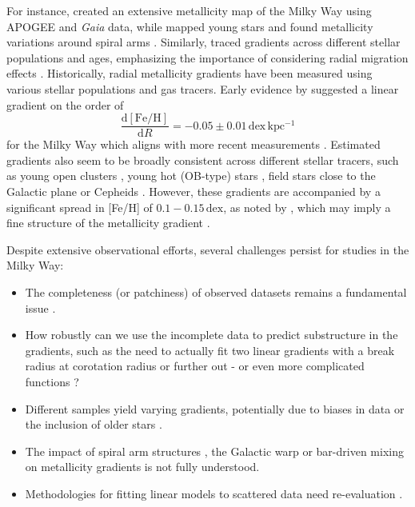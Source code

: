 \documentclass[twocolumn,apj,numberedappendix,appendixfloats]{openjournal}
\begin{document}
\begin{CJK*}{UTF8}{gbsn}
For instance, \citet{Hogg2019} created an extensive metallicity map of the Milky Way using APOGEE and \textit{Gaia} data, while \citet{Poggio2022} mapped young stars and found metallicity variations around spiral arms \citep[see also][]{Zari2018, Zari2021, Poggio2021, Hackshaw2024}. Similarly, \citet[][among others]{Imig2023} traced gradients across different stellar populations and ages, emphasizing the importance of considering radial migration effects \citep{Binney2008, Frankel2018, Frankel2020}. Historically, radial metallicity gradients have been measured using various stellar populations and gas tracers. Early evidence by \citet{Janes1979} suggested a linear gradient on the order of
\begin{equation}
\frac{\mathrm{d{[Fe/H]}}}{\mathrm{d}R} = -0.05 \pm 0.01\,\mathrm{dex\,kpc^{-1}}
\end{equation}
for the Milky Way which aligns with more recent measurements \citep{Anders2017, Hayden2015}. Estimated gradients also seem to be broadly consistent across different stellar tracers, such as young open clusters \citep[e.g.][]{Yong2012, Cunha2016, Magrini2017, Casamiquela2019, Donor2020, Spina2021,Myers2022}, young hot (OB-type) stars \citep{Zari2018, Zari2021, Poggio2021, Poggio2022}, field stars close to the Galactic plane \citep[e.g.][]{Bergemann2014} or Cepheids \citep{Andrievsky2002, Andrievsky2002b, Lemasle2007, Lemasle2013}. However, these gradients are accompanied by a significant spread in [Fe/H] of $0.1-0.15\,\mathrm{dex}$, as noted by \citet{Twarog1980}, which may imply a fine structure of the metallicity gradient \citep[see][]{Genovali2014}.

Despite extensive observational efforts, several challenges persist for studies in the Milky Way:
\begin{itemize}
    \item The completeness (or patchiness) of observed datasets remains a fundamental issue \citep{Bergemann2014}.
    \item How robustly can we use the incomplete data to predict substructure in the gradients, such as the need to actually fit two linear gradients with a break radius at corotation radius \citep[][and references therein]{Bresolin2012} or further out \citep{Yong2012, Donor2020} - or even more complicated functions \citep[see e.g.][]{Chiappini2001, Kubryk2015}?
    \item Different samples yield varying gradients, potentially due to biases in data or the inclusion of older stars \citep[e.g.][]{Boeche2013, AllendePrieto2006, Katz2011, Hayden2014, Anders2014, Vickers2021, Willett2023}.
    \item The impact of spiral arm structures \citep{Poggio2021}, the Galactic warp \citep{Lemasle2022} or bar-driven mixing \citep{DiMatteo2013} on metallicity gradients is not fully understood.
    \item Methodologies for fitting linear models to scattered data need re-evaluation \citep{Metha2021}.
\end{itemize}


\end{CJK*}
\end{document}
